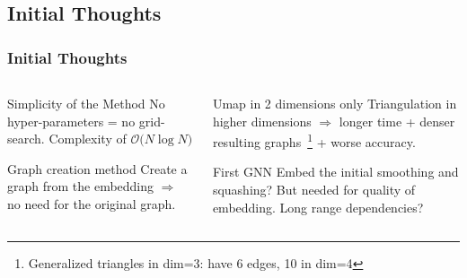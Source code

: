 \documentclass[10pt, aspectratio = 169]{beamer}
\begin{document}
\subsection{Initial Thoughts}
\begin{frame}
    \frametitle{Initial Thoughts}
    \begin{columns}[t]
        \begin{column}{0.5\textwidth}
            \begin{block}{Simplicity of the Method}
                No hyper-parameters = no grid-search. 
                Complexity of $\mathcal{O} \big( N \log N \big)$
            \end{block}
            \begin{block}{Graph creation method}
                Create a graph from the embedding $\Rightarrow$ no need for the original graph.
            \end{block}
        \end{column}
        \begin{column}{0.5\textwidth}
            \begin{alertblock}{Umap in 2 dimensions only}
                Triangulation in higher dimensions $\Rightarrow$ longer time + denser resulting 
                graphs~\footnote{Generalized triangles in dim=3: have 6 edges, 10 in dim=4} + worse accuracy.
            \end{alertblock}
            \begin{alertblock}{First GNN}
                Embed the initial smoothing and squashing? But needed for quality of 
                embedding. Long range dependencies? 
            \end{alertblock}
        \end{column}
    \end{columns}

\end{frame}
\end{document}

